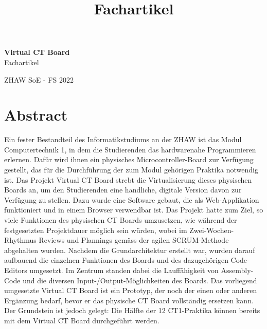 \documentclass[10pt]{article}
\title{Fachartikel}
\begin{document}
\begin{titlepage}

\raggedleft %
	
	\vspace*{\baselineskip} %
	
	
	\vspace*{0.167\textheight} %
	
	\textbf{\LARGE Virtual CT Board}\\[\baselineskip] %
	
	\Huge Fachartikel\\[\baselineskip] %
	
	\vfill %
	
	{\large ZHAW SoE - FS 2022}
	
	\vspace*{3\baselineskip} %


\end{titlepage}

\section*{Abstract}
\thispagestyle{empty}


Ein fester Bestandteil des Informatikstudiums an der ZHAW ist das Modul \glqq Computertechnik 1\grqq, in dem die Studierenden das hardwarenahe Programmieren erlernen. Dafür wird ihnen ein physisches Microcontroller-Board zur Verfügung gestellt, das für die Durchführung der zum Modul gehörigen Praktika notwendig ist. Das Projekt \glqq Virtual CT Board\grqq{} strebt die Virtualisierung dieses physischen Boards an, um den Studierenden eine handliche, digitale Version davon zur Verfügung zu stellen. Dazu wurde eine Software gebaut, die als Web-Applikation funktioniert und in einem Browser verwendbar ist. Das Projekt hatte zum Ziel, so viele Funktionen des physischen CT Boards umzusetzen, wie während der festgesetzten Projektdauer möglich sein würden, wobei im Zwei-Wochen-Rhythmus Reviews und Plannings gemäss der agilen SCRUM-Methode abgehalten wurden. Nachdem die Grundarchitektur erstellt war, wurden darauf aufbauend die einzelnen Funktionen des Boards und des dazugehörigen Code-Editors umgesetzt. Im Zentrum standen dabei die Lauffähigkeit von Assembly-Code und die diversen Input-/Output-Möglichkeiten des Boards.
\newline Das vorliegend umgesetzte \glqq Virtual CT Board\grqq{} ist ein Prototyp, der noch der einen oder anderen Ergänzung bedarf, bevor er das physische CT Board vollständig ersetzen kann. Der Grundstein ist jedoch gelegt: Die Hälfte der 12 CT1-Praktika können bereits mit dem \glqq Virtual CT Board\grqq{} durchgeführt werden. 
\end{document}
